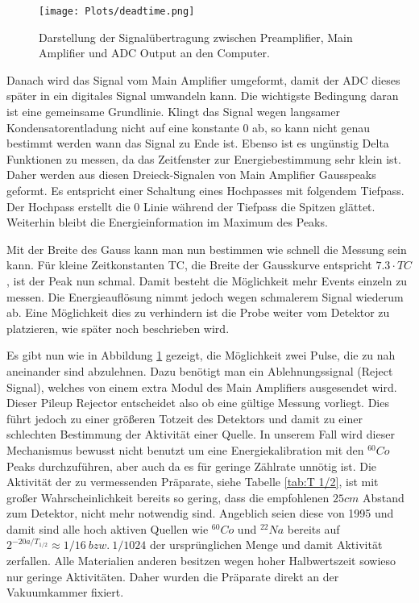 \documentclass[]{article}
\begin{document}
\begin{figure}[H]
\centering 
\texttt{[image: Plots/deadtime.png]}
\caption{Darstellung der Signalübertragung zwischen Preamplifier, Main Amplifier und ADC Output an den Computer. \cite{signalverarbeitung}  }
\label{fig:signals}
\end{figure}

Danach wird das Signal vom Main Amplifier umgeformt, damit der ADC dieses später in ein digitales Signal umwandeln kann. Die wichtigste Bedingung daran ist eine gemeinsame Grundlinie. Klingt das Signal wegen langsamer Kondensatorentladung nicht auf eine konstante 0 ab, so kann nicht genau bestimmt werden wann das Signal zu Ende ist. Ebenso ist es ungünstig Delta Funktionen zu messen, da das Zeitfenster zur Energiebestimmung sehr klein ist. Daher werden aus diesen Dreieck-Signalen von Main Amplifier Gausspeaks geformt. Es entspricht einer Schaltung eines Hochpasses mit folgendem Tiefpass. Der Hochpass erstellt die 0 Linie während der Tiefpass die Spitzen glättet. Weiterhin bleibt die Energieinformation im Maximum des Peaks.

Mit der Breite des Gauss kann man nun bestimmen wie schnell die Messung sein kann. Für kleine Zeitkonstanten TC, die Breite der Gausskurve entspricht $7.3\cdot TC$ \cite{signalverarbeitung}, ist der Peak nun schmal. Damit besteht die Möglichkeit mehr Events einzeln zu messen. Die Energieauflösung nimmt jedoch wegen schmalerem Signal wiederum ab. Eine Möglichkeit dies zu verhindern ist die Probe weiter vom Detektor zu platzieren, wie später noch beschrieben wird.

Es gibt nun wie in Abbildung \ref{fig:signals} gezeigt, die Möglichkeit zwei Pulse, die zu nah aneinander sind abzulehnen. Dazu benötigt man ein Ablehnungssignal (Reject Signal), welches von einem extra Modul des Main Amplifiers ausgesendet wird. Dieser Pileup Rejector entscheidet also ob eine gültige Messung vorliegt. Dies führt jedoch zu einer größeren Totzeit des Detektors und damit zu einer schlechten Bestimmung der Aktivität einer Quelle. In unserem Fall wird dieser Mechanismus bewusst nicht benutzt um eine Energiekalibration mit den $^{60}Co$ Peaks durchzuführen, aber auch da es für geringe Zählrate unnötig ist.  
Die Aktivität der zu vermessenden Präparate, siehe Tabelle \ref{tab:T 1/2}, ist mit großer Wahrscheinlichkeit bereits so gering, dass die empfohlenen $25cm$ Abstand zum Detektor, nicht mehr notwendig sind. Angeblich seien diese von 1995 und damit sind alle hoch aktiven Quellen wie $^{60}Co$ und $^{22}Na$ bereits auf $2^{-20a/T_{1/2}} \approx 1/16 \ bzw. \ 1/1024 $ der ursprünglichen Menge und damit Aktivität zerfallen. Alle Materialien anderen besitzen wegen hoher Halbwertszeit sowieso nur geringe Aktivitäten. 
Daher wurden die Präparate direkt an der Vakuumkammer fixiert.
\end{document}
